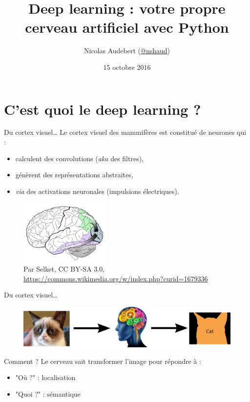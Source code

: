 \documentclass{beamer}
\title{Deep learning : votre propre cerveau artificiel avec Python}
\date[15 octobre 2016]{15 octobre 2016}
\author[\url{https://nicolas.audebert.at}]{Nicolas Audebert (\href{https://twitter.com/nshaud}{@nshaud})}
\institute{\href{mailto:nicolas+python@audebert.at}{nicolas+python@audebert.at}}
\begin{document}
\setmainfont{Fira Sans}
\maketitle

\begin{frame}
\tableofcontents
\end{frame}

\section{C'est quoi le deep learning ?}

\begin{frame}{Du cortex visuel\dots}  
Le cortex visuel des mammifères est constitué de neurones qui :
\begin{itemize}
	\item calculent des convolutions (\textit{aka} des filtres),
    \item génèrent des représentations abstraites,
    \item \textit{via} des activations neuronales (impulsions électriques).
\end{itemize}
\begin{figure}
 \includegraphics[width=0.4\textwidth]{cortex}\\
 \tiny{Par Selket, CC BY-SA 3.0, \url{https://commons.wikimedia.org/w/index.php?curid=1679336}}
\end{figure}
\end{frame}

\begin{frame}{Du cortex visuel\dots}
\begin{figure}
	\includegraphics[width=\textwidth]{visual_cortex_task}
\end{figure}
\begin{block}{Comment ?}
Le cerveau sait transformer l'image pour répondre à :
\begin{itemize}
	\item "Où ?" : localisation
    \item "Quoi ?" : sémantique
\end{itemize}
\end{block}
\end{frame}
\end{document}
